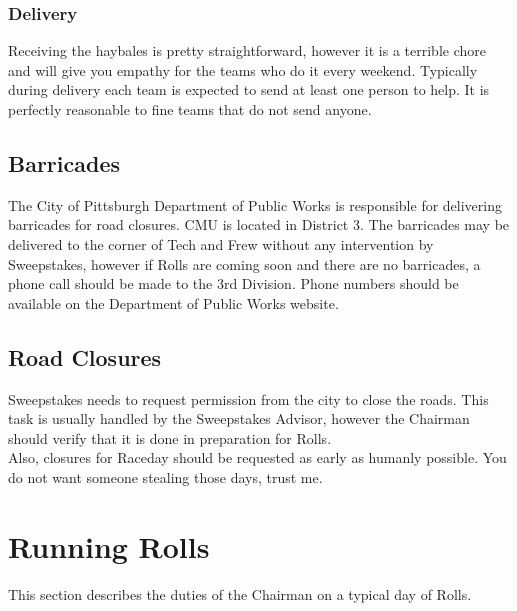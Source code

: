 \subsubsection{Delivery}
Receiving the haybales is pretty straightforward, however it is a terrible
chore and will give you empathy for the teams who do it every weekend.
Typically during delivery each team is expected to send at least one person to
help. It is perfectly reasonable to fine teams that do not send anyone.

\subsection{Barricades}
The City of Pittsburgh Department of Public Works is responsible for delivering
barricades for road closures. CMU is located in District 3. The barricades may
be delivered to the corner of Tech and Frew without any intervention by
Sweepstakes, however if Rolls are coming soon and there are no barricades,
a phone call should be made to the 3rd Division. Phone numbers should be
available on the Department of Public Works website.

\subsection{Road Closures}
Sweepstakes needs to request permission from the city to close the roads.
This task is usually handled by the Sweepstakes Advisor, however the Chairman
should verify that it is done in preparation for Rolls.
\\
Also, closures for Raceday should be requested as early as humanly possible.
You do not want someone stealing those days, trust me.


\section{Running Rolls}
\label{sec:ChairRunningRolls}
This section describes the duties of the Chairman on a typical day of Rolls.


